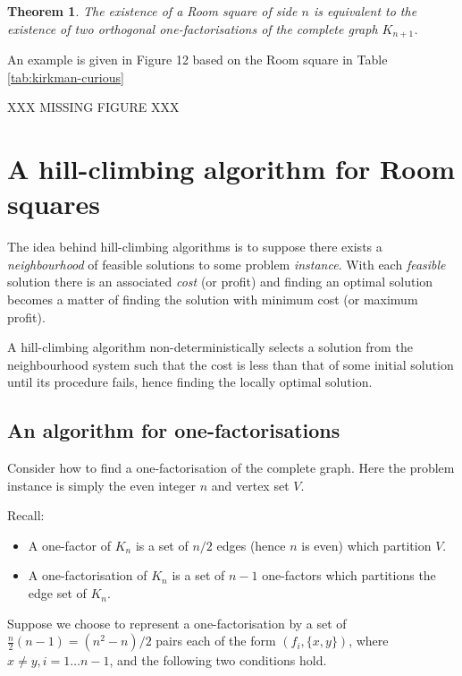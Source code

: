 \documentclass[
  11pt,
  a4paper]{book}
\newtheorem{theorem}{Theorem}
\begin{document}
\begin{theorem}
The existence of a Room square of side $n$
is equivalent to the existence of two orthogonal
one-factorisations of the complete graph $K_{n+1}$.
\end{theorem}

An example is given in Figure 12 based on the Room square
in Table
\ref{tab:kirkman-curious}

XXX MISSING FIGURE XXX

\hypertarget{a-hill-climbing-algorithm-for-room-squares}{%
\section{A hill-climbing algorithm for Room squares}\label{a-hill-climbing-algorithm-for-room-squares}}

The idea behind hill-climbing algorithms is to suppose
there exists a \emph{neighbourhood} of feasible solutions to
some problem \emph{instance}. With each \emph{feasible} solution
there is an associated \emph{cost} (or profit) and finding
an optimal solution becomes a matter of finding the solution
with minimum cost (or maximum profit).

A hill-climbing algorithm non-deterministically selects a
solution from the neighbourhood system such that the cost
is less than that of some initial solution until its
procedure fails, hence finding the locally optimal solution.

\hypertarget{an-algorithm-for-one-factorisations}{%
\subsection{An algorithm for one-factorisations}\label{an-algorithm-for-one-factorisations}}

Consider how to find a one-factorisation of the complete
graph. Here the problem instance is simply the even integer
\(n\) and vertex set \(V\).

Recall:

\begin{itemize}
\item
  A one-factor of \(K_n\) is a set of \(n/2\) edges (hence
  \(n\) is even) which partition \(V\).
\item
  A one-factorisation of \(K_n\) is a set of \(n - 1\) one-factors
  which partitions the edge set of \(K_n\).
\end{itemize}

Suppose we choose to represent a one-factorisation by a set
of \(\frac{n}{2}(n - 1) = (n^2 - n)/2\) pairs each of the form
\((f_i, \{x, y\})\), where \(x \neq y, i = 1 \ldots n - 1\),
and the following two conditions hold.
\end{document}
